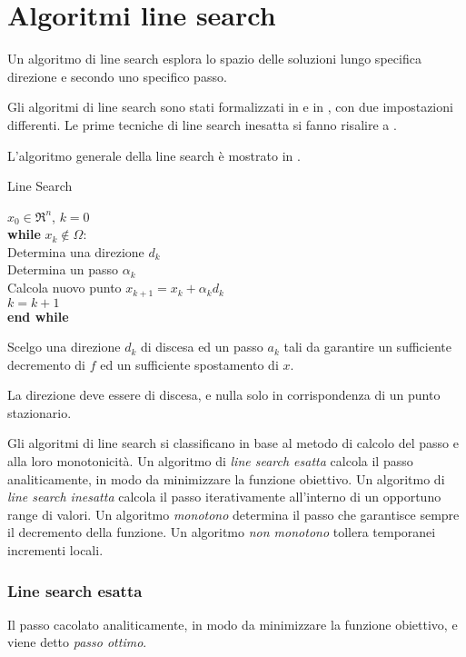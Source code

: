 \chapter{Algoritmi line search}
\label{chp:line.search}
Un algoritmo di line search esplora lo spazio delle soluzioni lungo specifica
direzione e secondo uno specifico passo.

Gli algoritmi di line search sono stati formalizzati in \cite{ortega1970iterative}
e in \cite{bertsekas1999nonlinear}, con due impostazioni differenti. Le prime
tecniche di line search inesatta si fanno risalire a \cite{goldstein1962cauchy}.

L'algoritmo generale della line search è mostrato in .

\begin{algorithm}
	\label{alg:linesearch}
	\caption{Line Search}
	$x_{0}\in\Re^{n}$, $k=0$ \\
	\textbf{while} $x_{k}\notin\Omega$: \\
	Determina una direzione $d_{k}$ \\
	Determina un passo $\alpha_{k}$ \\
	Calcola nuovo punto $x_{k+1}=x_{k}+\alpha_{k}d_{k}$ \\
	$k=k+1$\\
	\textbf{end while}
\end{algorithm}

Scelgo una direzione $d_{k}$ di discesa ed un passo $a_{k}$ tali da garantire un sufficiente decremento di $f$ ed un sufficiente spostamento di $x$.

La direzione deve essere di discesa, e nulla solo in corrispondenza di un punto stazionario.

Gli algoritmi di line search si classificano in base al metodo di calcolo del passo e alla loro monotonicità.
Un algoritmo di \textit{line search esatta} calcola il passo analiticamente, in modo da minimizzare la funzione obiettivo.
Un algoritmo di \textit{line search inesatta} calcola il passo iterativamente all'interno di un opportuno range di valori.
Un algoritmo \textit{monotono} determina il passo che garantisce sempre il decremento della funzione. Un algoritmo \textit{non monotono} tollera temporanei incrementi locali.


\subsection{Line search esatta}
\label{sec:linesearch.exact}
Il passo cacolato analiticamente, in modo da minimizzare la funzione obiettivo, e viene detto \textit{passo ottimo}.

